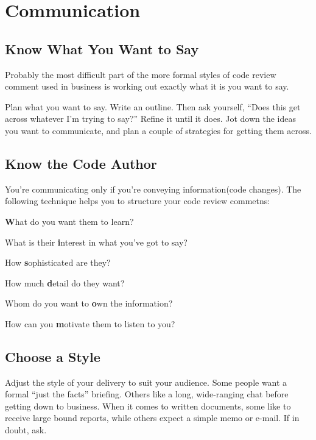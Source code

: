 
\chapter{Communication}

\section{Know What You Want to Say}

Probably the most difficult part of the more formal styles of code review comment used in business is working out exactly what it is you want to say.

Plan what you want to say. Write an outline. Then ask yourself, “Does this get across whatever I’m trying to say?” Refine it until it does. Jot down the ideas you want to communicate, and plan a couple of strategies for getting them across.

\section{Know the Code Author}

You’re communicating only if you’re conveying information(code changes). The following technique helps you to structure your code review commetns:

\begin{tcolorbox}[
    title = The \textbf{WISDOM} acrostic - understanding the audience(code author)
]

\textbf{W}hat do you want them to learn?

What is their \textbf{i}nterest in what you’ve got to say?

How \textbf{s}ophisticated are they?

How much \textbf{d}etail do they want?

Whom do you want to \textbf{o}wn the information?

How can you \textbf{m}otivate them to listen to you?

\end{tcolorbox}

\section{Choose a Style}

Adjust the style of your delivery to suit your audience. Some people want a formal “just the facts” briefing. Others like a long, wide-ranging chat before getting down to business. When it comes to written documents, some like to receive large bound reports, while others expect a simple memo or e-mail. If in doubt, ask.

